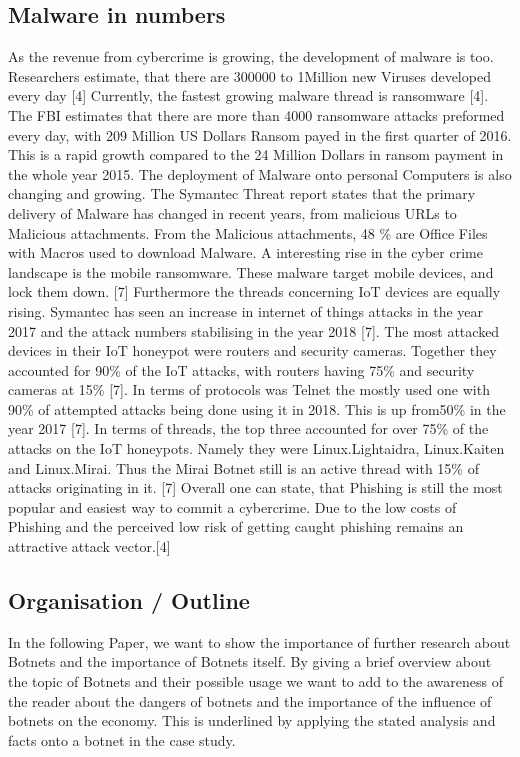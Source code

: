 \subsection{Malware in numbers}
As the revenue from cybercrime is growing, the development of malware is too. Researchers estimate, that there are 300000 to 1Million new Viruses developed every day [4] Currently, the fastest growing malware thread is ransomware [4]. The FBI estimates that there are more than 4000 ransomware attacks preformed every day, with 209 Million US Dollars Ransom payed in the first quarter of 2016. This is a rapid growth compared to the 24 Million Dollars in ransom payment in the whole year 2015. 
The deployment of Malware onto personal Computers is also changing and growing. The Symantec Threat report states that the primary delivery of Malware has changed in recent years, from malicious URLs to Malicious attachments. From the Malicious attachments, 48 \% are Office Files with Macros used to download Malware. 
A interesting rise in the cyber crime landscape is the mobile ransomware. These malware target mobile devices, and lock them down. [7]
Furthermore the threads concerning IoT devices are equally rising. Symantec has seen an increase in internet of things attacks in the year 2017 and the attack numbers stabilising in the year 2018 [7]. The most attacked devices in their IoT honeypot were routers and security cameras. Together they accounted for 90\% of the IoT attacks, with routers having 75\% and security cameras at 15\% [7]. In terms of protocols was Telnet the mostly used one with 90\% of attempted attacks being done using it in 2018. This is up from50\% in the year 2017 [7]. 
In terms of threads, the top three accounted for over 75\% of the attacks on the IoT honeypots. Namely they were Linux.Lightaidra, Linux.Kaiten and Linux.Mirai. Thus the Mirai Botnet still is an active thread with 15\% of attacks originating in it. [7] 
Overall one can state, that Phishing is still the most popular and easiest way to commit a cybercrime. Due to the low costs of Phishing and the perceived low risk of getting caught phishing remains an attractive attack vector.[4]

 
\subsection{Organisation / Outline}
In the following Paper, we want to show the importance of further research about Botnets and the importance of Botnets itself. By giving a brief overview about the topic of Botnets and their possible usage we want to add to the awareness of the reader about the dangers of botnets and the importance of the influence of botnets on the economy. This is underlined by applying the stated analysis and facts onto a botnet in the case study. 



